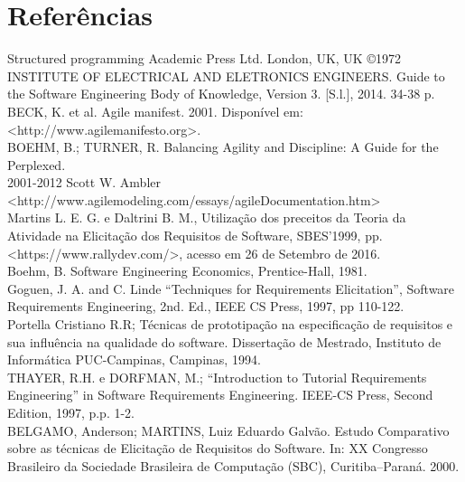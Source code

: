 
\chapter[Referências]{Referências}
Structured programming  Academic Press Ltd. London, UK, UK ©1972\\

INSTITUTE OF ELECTRICAL AND ELETRONICS ENGINEERS. Guide to the Software Engineering Body of Knowledge, Version 3. [S.l.], 2014. 34-38 p.\\

BECK, K. et al. Agile manifest. 2001. Disponível em: <http://www.agilemanifesto.org>.\\

BOEHM, B.; TURNER, R. Balancing Agility and Discipline: A Guide for the Perplexed.\\

2001-2012 Scott W. Ambler \\<http://www.agilemodeling.com/essays/agileDocumentation.htm>\\

Martins L. E. G. e Daltrini B. M., Utilização dos preceitos da Teoria da Atividade na Elicitação dos Requisitos de Software, SBES’1999, pp.\\

<https://www.rallydev.com/>, acesso em 26 de Setembro de 2016.\\
Boehm, B. Software Engineering Economics, Prentice-Hall, 1981.\\

Goguen, J. A. and C. Linde “Techniques for Requirements Elicitation”, Software Requirements Engineering, 2nd. Ed., IEEE CS Press, 1997, pp 110-122.\\

Portella Cristiano R.R; Técnicas de prototipação na especificação de requisitos e sua influência na qualidade do software. Dissertação de Mestrado, Instituto de Informática PUC-Campinas, Campinas, 1994.\\

THAYER, R.H. e DORFMAN, M.; “Introduction to Tutorial Requirements Engineering” in Software Requirements Engineering. IEEE-CS Press, Second Edition, 1997, p.p. 1-2.\\

BELGAMO, Anderson; MARTINS, Luiz Eduardo Galvão. Estudo Comparativo sobre as técnicas de Elicitação de Requisitos do Software. In: XX Congresso Brasileiro da Sociedade Brasileira de Computação (SBC), Curitiba–Paraná. 2000.\\

